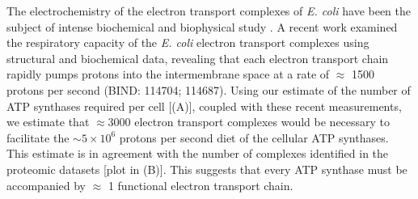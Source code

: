 The electrochemistry of the electron transport complexes of \textit{E. coli}
have been the subject of intense biochemical and biophysical study
\citep{ingledew1984, khademian2017,cox1970,henkel2014}. A recent work
\citep{szenk2017} examined the respiratory capacity of the \textit{E. coli}
electron transport complexes using structural and biochemical data, revealing
that each electron transport chain rapidly pumps protons into the
intermembrane space at a rate of $\approx$ 1500 protons per second (BIND:
114704; 114687). Using our estimate of the number of ATP synthases required
per cell [(A)], coupled with these recent
measurements, we estimate that $\approx 3000$ electron transport complexes
would be necessary to facilitate the $\sim 5 \times 10^6$ protons per second
diet of the cellular ATP synthases. This estimate is in agreement with the
number of complexes identified in the proteomic datasets [plot in
(B)]. This suggests that every ATP synthase must be
accompanied by $\approx$ 1 functional electron transport chain.


